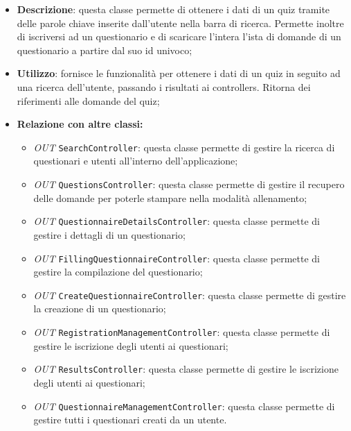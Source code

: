 \begin{itemize}
	\item \textbf{Descrizione}: questa classe permette di ottenere i dati di un quiz tramite delle parole chiave inserite dall'utente nella barra di ricerca. Permette inoltre di iscriversi ad un questionario e di scaricare l'intera l'ista di domande di un questionario a partire dal suo id univoco;
	\item \textbf{Utilizzo}: fornisce le funzionalità per ottenere i dati di un quiz in seguito ad una ricerca dell'utente, passando i risultati ai controllers. Ritorna dei riferimenti alle domande del quiz;
	\item \textbf{Relazione con altre classi:}
	\begin{itemize}
		\item \textit{OUT} \texttt{SearchController}: questa classe permette di gestire la ricerca di questionari e utenti all'interno dell'applicazione;
		\item \textit{OUT} \texttt{QuestionsController}: questa classe permette di gestire il recupero delle domande per poterle stampare nella modalità allenamento;
		\item \textit{OUT} \texttt{QuestionnaireDetailsController}: questa classe permette di gestire i dettagli di un questionario;
		\item \textit{OUT} \texttt{FillingQuestionnaireController}: questa classe permette di gestire la compilazione del questionario;
		\item \textit{OUT} \texttt{CreateQuestionnaireController}: questa classe permette di gestire la creazione di un questionario;
		\item \textit{OUT} \texttt{RegistrationManagementController}: questa classe permette di gestire le iscrizione degli utenti ai questionari;
		\item \textit{OUT} \texttt{ResultsController}: questa classe permette di gestire le iscrizione degli utenti ai questionari; 
		\item \textit{OUT} \texttt{QuestionnaireManagementController}: questa classe permette di gestire tutti i questionari creati da un utente. 
		

\end{itemize}
\end{itemize}
